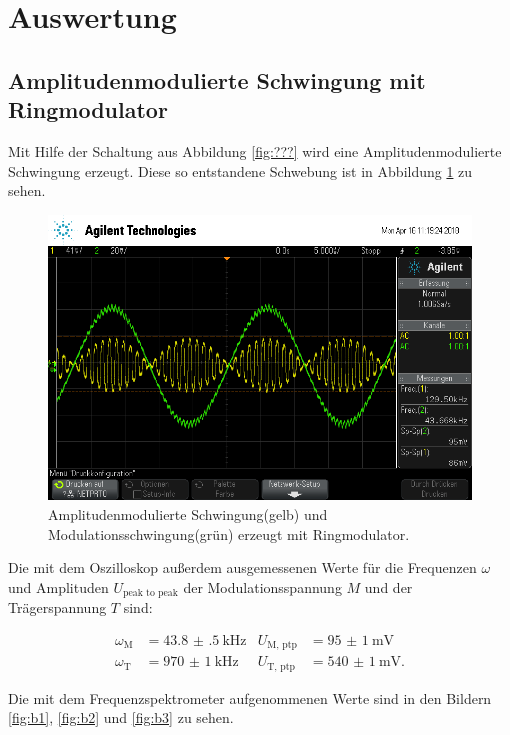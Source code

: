 \section{Auswertung}
\label{sec:Auswertung}

\subsection{Amplitudenmodulierte Schwingung mit Ringmodulator}

Mit Hilfe der Schaltung aus Abbildung \ref{fig:???} wird eine Amplitudenmodulierte Schwingung erzeugt.
Diese so entstandene Schwebung ist in Abbildung \ref{fig:amplModOszi} zu sehen.

\begin{figure}[h]
  \centering
  \includegraphics[width=.9\textwidth]{Oszi_Pics/amplModRing.png}
  \caption{Amplitudenmodulierte Schwingung(gelb) und Modulationsschwingung(grün) erzeugt mit Ringmodulator.}
  \label{fig:amplModOszi}
\end{figure}

Die mit dem Oszilloskop außerdem ausgemessenen Werte für die Frequenzen $\omega$ und Amplituden $U_\text{peak to peak}$ der Modulationsspannung $M$ und der Trägerspannung $T$ sind:

\begin{align*}
  \omega_\text{M} &= \SI{43.8(5)}{\kilo\hertz} & U_\text{M, ptp} &= \SI{95(1)}{\milli\volt}\\
  \omega_\text{T} &= \SI{970(1)}{\kilo\hertz} & U_\text{T, ptp} &= \SI{540(1)}{\milli\volt}.
\end{align*}

Die mit dem Frequenzspektrometer aufgenommenen Werte sind in den Bildern \ref{fig:b1}, \ref{fig:b2} und \ref{fig:b3} zu sehen.

